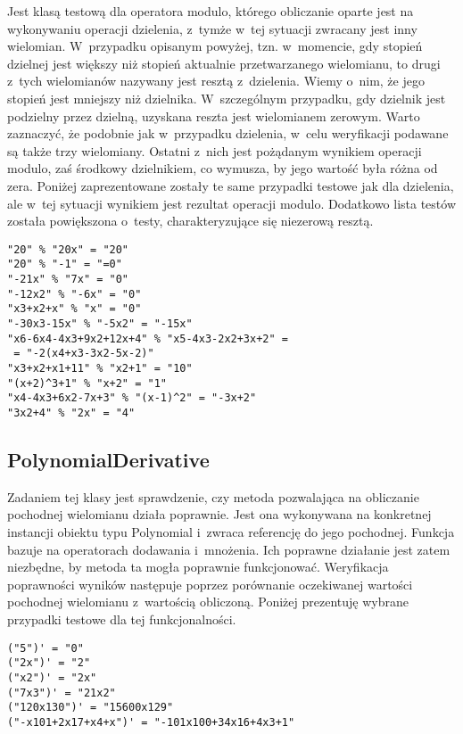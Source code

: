 Jest klasą testową dla operatora modulo, którego obliczanie oparte jest na wykonywaniu operacji dzielenia, z~tymże w~tej sytuacji zwracany jest inny wielomian. W~przypadku opisanym powyżej, tzn. w~momencie, gdy stopień dzielnej jest większy niż stopień aktualnie przetwarzanego wielomianu, to drugi z~tych wielomianów nazywany jest resztą z~dzielenia. Wiemy o~nim, że jego stopień jest mniejszy niż dzielnika. W~szczególnym przypadku, gdy dzielnik jest podzielny przez dzielną, uzyskana reszta jest wielomianem zerowym. Warto zaznaczyć, że podobnie jak w~przypadku dzielenia, w~celu weryfikacji podawane są także trzy wielomiany. Ostatni z~nich jest pożądanym wynikiem operacji modulo, zaś środkowy dzielnikiem, co wymusza, by jego wartość była różna od zera. Poniżej zaprezentowane zostały te same przypadki testowe jak dla dzielenia, ale w~tej sytuacji wynikiem jest rezultat operacji modulo. Dodatkowo lista testów została powiększona o~testy, charakteryzujące się niezerową resztą.

\begin{lstlisting}
"20" % "20x" = "20"
"20" % "-1" = "=0"
"-21x" % "7x" = "0"
"-12x2" % "-6x" = "0"
"x3+x2+x" % "x" = "0"
"-30x3-15x" % "-5x2" = "-15x"
"x6-6x4-4x3+9x2+12x+4" % "x5-4x3-2x2+3x+2" =
 = "-2(x4+x3-3x2-5x-2)"
"x3+x2+x1+11" % "x2+1" = "10"
"(x+2)^3+1" % "x+2" = "1"
"x4-4x3+6x2-7x+3" % "(x-1)^2" = "-3x+2"
"3x2+4" % "2x" = "4"
\end{lstlisting}

\subsection{PolynomialDerivative}

Zadaniem tej klasy jest sprawdzenie, czy metoda pozwalająca na obliczanie pochodnej wielomianu działa poprawnie. Jest ona wykonywana na konkretnej instancji obiektu typu Polynomial i~zwraca referencję do jego pochodnej. Funkcja bazuje na operatorach dodawania i~mnożenia. Ich poprawne działanie jest zatem niezbędne, by metoda ta mogła poprawnie funkcjonować.
Weryfikacja poprawności wyników następuje poprzez porównanie oczekiwanej wartości pochodnej wielomianu z~wartością obliczoną. Poniżej prezentuję wybrane przypadki testowe dla tej funkcjonalności.

\begin{lstlisting}
("5")' = "0"
("2x")' = "2"
("x2")' = "2x"
("7x3")' = "21x2"
("120x130")' = "15600x129"
("-x101+2x17+x4+x")' = "-101x100+34x16+4x3+1"
\end{lstlisting}

